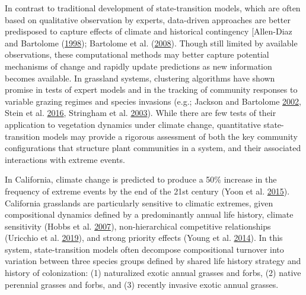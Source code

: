 \documentclass[twoside,12pt,final]{ucthesis-CA2012}
\begin{document}
\begin{ucmainmatter}
In contrast to traditional development of state-transition models, which are often based on qualitative observation by experts, data-driven approaches are better predisposed to capture effects of climate and historical contingency {[}Allen-Diaz and Bartolome (\protect\hyperlink{ref-Allen-Diaz1998}{1998}); Bartolome et al. (\protect\hyperlink{ref-Bartolome2008}{2008}).
Though still limited by available observations, these computational methods may better capture potential mechanisms of change and rapidly update predictions as new information becomes available.
In grassland systems, clustering algorithms have shown promise in tests of expert models and in the tracking of community responses to variable grazing regimes and species invasions (e.g.; Jackson and Bartolome \protect\hyperlink{ref-Jackson2002}{2002}, Stein et al. \protect\hyperlink{ref-Stein2016}{2016}, Stringham et al. \protect\hyperlink{ref-Stringham2003}{2003}).
While there are few tests of their application to vegetation dynamics under climate change, quantitative state-transition models may provide a rigorous assessment of both the key community configurations that structure plant communities in a system, and their associated interactions with extreme events.

In California, climate change is predicted to produce a 50\% increase in the frequency of extreme events by the end of the 21st century (Yoon et al. \protect\hyperlink{ref-Yoon2015}{2015}).
California grasslands are particularly sensitive to climatic extremes, given compositional dynamics defined by a predominantly annual life history, climate sensitivity (Hobbs et al. \protect\hyperlink{ref-Hobbs2007}{2007}), non-hierarchical competitive relationships (Uricchio et al. \protect\hyperlink{ref-Uricchio2019}{2019}), and strong priority effects (Young et al. \protect\hyperlink{ref-Young2014}{2014}).
In this system, state-transition models often decompose compositional turnover into variation between three species groups defined by shared life history strategy and history of colonization: (1) naturalized exotic annual grasses and forbs, (2) native perennial grasses and forbs, and (3) recently invasive exotic annual grasses.


\end{ucmainmatter}
\end{document}
